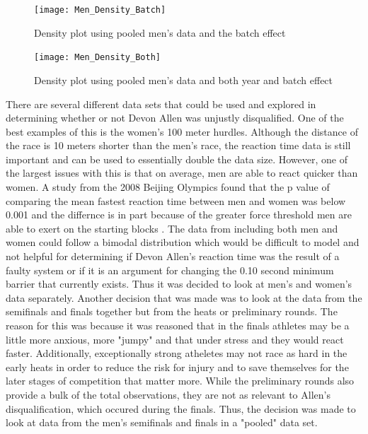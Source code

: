 \documentclass[12pt, letterpaper, titlepage]{article}
\begin{document}
\begin{figure}[h]
  \centering
  \begin{minipage}{0.45\textwidth}
      \centering
      \texttt{[image: Men\_Density\_Batch]} %
      \caption{Density plot using pooled men's data and the batch effect}
  \end{minipage}\hfill
  \begin{minipage}{0.45\textwidth}
      \centering
      \texttt{[image: Men\_Density\_Both]} %
      \caption{Density plot using pooled men's data and both year and batch effect}
  \end{minipage}
\end{figure}


There are several different data sets that could be used and explored in determining 
whether or not Devon Allen was unjustly disqualified.  One of the best examples of this
is the women's 100 meter hurdles. Although the distance of the race is 10 meters shorter
than the men's race, the reaction time data is still important and can be used to
essentially double the data size.  However, one of the largest issues with this is that on average, men are able to react quicker than women.  A study from the 2008 Beijing Olympics found that the p value of comparing the mean fastest reaction time between men and women was below 0.001 and the differnce is in part because of the greater force threshold men are able to exert on the starting blocks \citep{Lipps}. The data from including both men and women could follow a bimodal distribution which would be difficult to model and not helpful for determining if Devon Allen's reaction time was the result of a faulty system or if it is an argument
for changing the 0.10 second minimum barrier that currently exists.  Thus it was decided
to look at men's and women's data separately.  Another decision that was made was to look
at the data from the semifinals and finals together but from the heats or preliminary rounds.  The reason for this was because it was reasoned that in the finals athletes may
be a little more anxious, more "jumpy" and that under stress and they would react faster.
Additionally, exceptionally strong atheletes may not race as hard in the early heats in
order to reduce the risk for injury and to save themselves for the later stages of
competition that matter more. While the preliminary rounds also provide a bulk of the total observations, they are not as relevant to Allen's disqualification, which occured during the finals.  Thus, the decision was made to look at data from the men's semifinals
and finals in a "pooled" data set.
\end{document}
